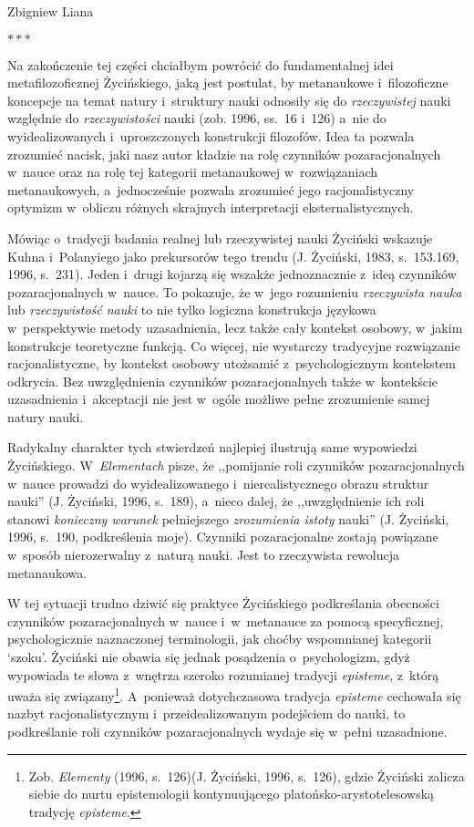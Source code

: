 \begin{artplenv}{Zbigniew Liana}
\medskip
{\centering$\ast\ast\ast$\par}
\smallskip


Na zakończenie tej części chciałbym powrócić do fundamentalnej idei metafilozoficznej Życińskiego, jaką jest postulat,
by metanaukowe i~filozoficzne koncepcje na temat natury i~struktury nauki odnosiły się do \textit{rzeczywistej} nauki
względnie do \textit{rzeczywistości} nauki (zob. 1996, ss.~16 i~126) a~nie do wyidealizowanych i~uproszczonych
konstrukcji filozofów. Idea ta pozwala zrozumieć nacisk, jaki nasz autor kładzie na rolę czynników pozaracjonalnych w~nauce
oraz na rolę tej kategorii metanaukowej w~rozwiązaniach metanaukowych, a~jednocześnie pozwala zrozumieć jego
racjonalistyczny optymizm w~obliczu różnych skrajnych interpretacji eksternalistycznych.

Mówiąc o~tradycji badania realnej lub rzeczywistej nauki Życiński wskazuje Kuhna i~Polanyiego jako prekursorów tego
trendu \label{ref:RNDi6TPvuVUK4}(J. Życiński, 1983, s.~153.169, 1996, s.~231). Jeden i~drugi kojarzą się wszakże
jednoznacznie z~ideą czynników pozaracjonalnych w~nauce. To pokazuje, że w~jego rozumieniu \textit{rzeczywista nauka} lub
\textit{rzeczywistość nauki} to nie tylko logiczna konstrukcja językowa w~perspektywie metody uzasadnienia, lecz także
cały kontekst osobowy, w~jakim konstrukcje teoretyczne funkcją. Co więcej, nie wystarczy tradycyjne rozwiązanie
racjonalistyczne, by kontekst osobowy utożsamić z~psychologicznym kontekstem odkrycia. Bez uwzględnienia czynników
pozaracjonalnych także w~kontekście uzasadnienia i~akceptacji nie jest w~ogóle możliwe pełne zrozumienie samej natury
nauki.

Radykalny charakter tych stwierdzeń najlepiej ilustrują same wypowiedzi Życińskiego. W~\textit{Elementach} pisze, że
,,pomijanie roli czynników pozaracjonalnych w~nauce prowadzi do wyidealizowanego i~nierealistycznego obrazu struktur
nauki'' \label{ref:RND07iSFRLobf}(J. Życiński, 1996, s.~189), a~nieco dalej, że ,,uwzględnienie ich roli stanowi
\textit{konieczny warunek} pełniejszego \textit{zrozumienia istoty} nauki'' \label{ref:RNDVV3U1jSC9D}(J. Życiński, 1996,
s.~190, podkreślenia moje).  Czynniki pozaracjonalne zostają powiązane w~sposób nierozerwalny z~naturą nauki. Jest to
rzeczywista rewolucja metanaukowa.

W tej sytuacji trudno dziwić się praktyce Życińskiego podkreślania obecności czynników pozaracjonalnych w~nauce i~w~metanauce
za pomocą specyficznej, psychologicznie naznaczonej terminologii, jak choćby wspomnianej kategorii `szoku'.
Życiński nie obawia się jednak posądzenia o~psychologizm, gdyż wypowiada te słowa z~wnętrza szeroko rozumianej tradycji
\textit{episteme}, z~którą uważa się związany\footnote{Zob. \textit{Elementy} (1996, s.~126)\label{ref:RNDxQIHHr1tkz}(J.
Życiński, 1996, s.~126), gdzie Życiński zalicza siebie do nurtu epistemologii kontynuującego platońsko-arystotelesowską
tradycję \textit{episteme}.}. A~ponieważ dotychczasowa tradycja \textit{episteme} cechowała się nazbyt racjonalistycznym i~przeidealizowanym
podejściem do nauki, to podkreślanie roli czynników pozaracjonalnych wydaje się w~pełni uzasadnione.


\end{artplenv}
